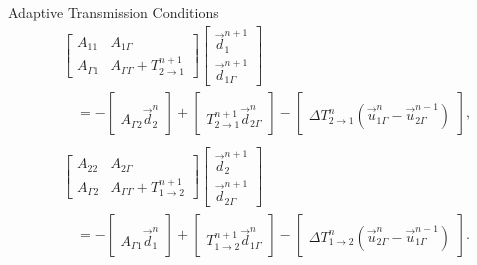 \documentclass{beamer}
\begin{document}
\begin{frame}{Adaptive Transmission Conditions}
\begin{align*}
	& \begin{bmatrix} A_{11} & A_{1 \Gamma} \\ A_{\Gamma 1} & A_{\Gamma \Gamma} + T_{2 \to 1}^{n+1} \end{bmatrix}
	\begin{bmatrix} \vec{d}_1^{n+1} \\ \vec{d}_{1 \Gamma}^{n+1} \end{bmatrix} \\
	& \quad = - \begin{bmatrix} ~ \\ A_{\Gamma 2} \vec{d}_2^n \end{bmatrix}
	+ \begin{bmatrix} ~ \\ T_{2 \to 1}^{n+1} \vec{d}_{2 \Gamma}^n \end{bmatrix}
	- \begin{bmatrix} ~ \\ \Delta T_{2 \to 1}^n (\vec{u}_{1 \Gamma}^n - \vec{u}_{2 \Gamma}^{n-1}) \end{bmatrix}, \\
	~ \\
	& \begin{bmatrix} A_{22} & A_{2 \Gamma} \\ A_{\Gamma 2} & A_{\Gamma \Gamma} + T_{1 \to 2}^{n+1} \end{bmatrix}
	\begin{bmatrix} \vec{d}_2^{n+1} \\ \vec{d}_{2 \Gamma}^{n+1} \end{bmatrix} \\
	& \quad = - \begin{bmatrix} ~ \\ A_{\Gamma 1} \vec{d}_1^n \end{bmatrix}
	+ \begin{bmatrix} ~ \\ T_{1 \to 2}^{n+1} \vec{d}_{1 \Gamma}^n \end{bmatrix}
	- \begin{bmatrix} ~ \\ \Delta T_{1 \to 2}^n (\vec{u}_{2 \Gamma}^n - \vec{u}_{1 \Gamma}^{n-1}) \end{bmatrix}.
\end{align*}
\end{frame}
\end{document}
